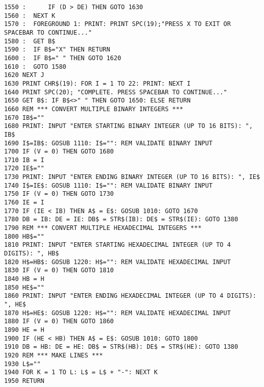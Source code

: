 \begin{tcolorbox}[colback=black,coltext=white]
\verbatimfont{\codefont}
\begin{verbatim}
1550 :      IF (D > DE) THEN GOTO 1630
1560 :  NEXT K
1570 :  FOREGROUND 1: PRINT: PRINT SPC(19);"PRESS X TO EXIT OR SPACEBAR TO CONTINUE..."
1580 :  GET B$
1590 :  IF B$="X" THEN RETURN
1600 :  IF B$=" " THEN GOTO 1620
1610 :  GOTO 1580
1620 NEXT J
1630 PRINT CHR$(19): FOR I = 1 TO 22: PRINT: NEXT I
1640 PRINT SPC(20); "COMPLETE. PRESS SPACEBAR TO CONTINUE..."
1650 GET B$: IF B$<>" " THEN GOTO 1650: ELSE RETURN
1660 REM *** CONVERT MULTIPLE BINARY INTEGERS ***
1670 IB$=""
1680 PRINT: INPUT "ENTER STARTING BINARY INTEGER (UP TO 16 BITS): ", IB$
1690 I$=IB$: GOSUB 1110: I$="": REM VALIDATE BINARY INPUT
1700 IF (V = 0) THEN GOTO 1680
1710 IB = I
1720 IE$=""
1730 PRINT: INPUT "ENTER ENDING BINARY INTEGER (UP TO 16 BITS): ", IE$
1740 I$=IE$: GOSUB 1110: I$="": REM VALIDATE BINARY INPUT
1750 IF (V = 0) THEN GOTO 1730
1760 IE = I
1770 IF (IE < IB) THEN A$ = E$: GOSUB 1010: GOTO 1670
1780 DB = IB: DE = IE: DB$ = STR$(IB): DE$ = STR$(IE): GOTO 1380
1790 REM *** CONVERT MULTIPLE HEXADECIMAL INTEGERS ***
1800 HB$=""
1810 PRINT: INPUT "ENTER STARTING HEXADECIMAL INTEGER (UP TO 4 DIGITS): ", HB$
1820 H$=HB$: GOSUB 1220: H$="": REM VALIDATE HEXADECIMAL INPUT
1830 IF (V = 0) THEN GOTO 1810
1840 HB = H
1850 HE$=""
1860 PRINT: INPUT "ENTER ENDING HEXADECIMAL INTEGER (UP TO 4 DIGITS): ", HE$
1870 H$=HE$: GOSUB 1220: H$="": REM VALIDATE HEXADECIMAL INPUT
1880 IF (V = 0) THEN GOTO 1860
1890 HE = H
1900 IF (HE < HB) THEN A$ = E$: GOSUB 1010: GOTO 1800
1910 DB = HB: DE = HE: DB$ = STR$(HB): DE$ = STR$(HE): GOTO 1380
1920 REM *** MAKE LINES ***
1930 L$=""
1940 FOR K = 1 TO L: L$ = L$ + "-": NEXT K
1950 RETURN
\end{verbatim}
\end{tcolorbox}
